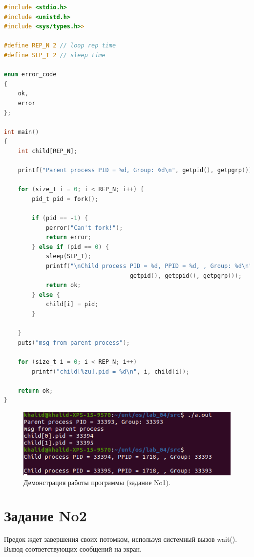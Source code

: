 \documentclass[12pt]{report}
\begin{document}
\begin{lstlisting}[label=some-code,caption=Процессы-сироты,language=C]
#include <stdio.h>
#include <unistd.h>
#include <sys/types.h>>

#define REP_N 2 // loop rep time
#define SLP_T 2 // sleep time

enum error_code
{
    ok,
    error
};

int main()
{
    int child[REP_N];

    printf("Parent process PID = %d, Group: %d\n", getpid(), getpgrp());

    for (size_t i = 0; i < REP_N; i++) {
        pid_t pid = fork();

        if (pid == -1) {
            perror("Can't fork!");
            return error;
        } else if (pid == 0) {
            sleep(SLP_T);
            printf("\nChild process PID = %d, PPID = %d, , Group: %d\n", \
                                    getpid(), getppid(), getpgrp());
            return ok;
        } else {
            child[i] = pid;
        }

    }
    puts("msg from parent process");
    
    for (size_t i = 0; i < REP_N; i++)
        printf("child[%zu].pid = %d\n", i, child[i]);
    
    return ok;
}
\end{lstlisting}

\begin{figure}[H]

	\centering

	\includegraphics[width=\linewidth]{img/task01.png}
	\caption{Демонстрация работы программы (задание No1).}

	\label{fig:task01}

\end{figure}

\section*{Задание No2}

Предок ждет завершения своих потомком, используя системный вызов
wait(). Вывод соответствующих сообщений на экран.
\end{document}
